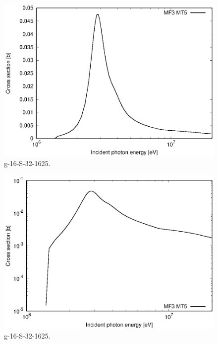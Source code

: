 \begin{figure}
 \includegraphics[width=\linewidth]{eps/g_16-S-32_1625.eps}
  \caption{g-16-S-32-1625.}
\end{figure}
\begin{figure}
 \includegraphics[width=\linewidth]{eps-log/g_16-S-32_1625.eps}
 \caption{g-16-S-32-1625.}
\end{figure}
\newpage \clearpage


